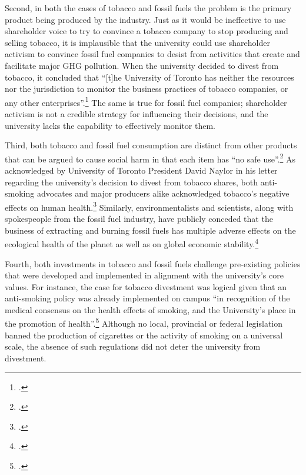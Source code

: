 Second, in both the cases of tobacco and fossil fuels the problem is the primary product being produced by the industry.
Just as it would be ineffective to use shareholder voice to try to convince a tobacco company to stop producing and selling tobacco, it is implausible that the university could use shareholder activism to convince fossil fuel companies to desist from activities that create and facilitate major GHG pollution.
When the university decided to divest from tobacco, it concluded that ``[t]he University of Toronto has neither the resources nor the jurisdiction to monitor the business practices of tobacco companies, or any other enterprises''.\footcite[][p. 7]{TobaccoReport_2007}
The same is true for fossil fuel companies; shareholder activism is not a credible strategy for influencing their decisions, and the university lacks the capability to effectively monitor them.



Third, both tobacco and fossil fuel consumption are distinct from other products that can be argued to cause social harm in that each item has ``no safe use''.\footcite[See: ][p. 9]{TobaccoReport_2007}
As acknowledged by University of Toronto President David Naylor in his letter regarding the university's decision to divest from tobacco shares, both anti-smoking advocates and major producers alike acknowledged tobacco's negative effects on human health.\footcite[][]{TStarSellOff}  
Similarly, environmentalists and scientists, along with spokespeople from the fossil fuel industry, have publicly conceded that the business of extracting and burning fossil fuels has multiple adverse effects on the ecological health of the planet as well as on global economic stability.\footcite[See, for example: ][p. 3--18]{OilIndustryVanDenHove}



Fourth, both investments in tobacco and fossil fuels challenge pre-existing policies that were developed and implemented in alignment with the university's core values. 
For instance, the case for tobacco divestment was logical given that an anti-smoking policy was already implemented on campus ``in recognition of the medical consensus on the health effects of smoking, and the University's place in the promotion of health''.\footcite[See: ][p. 9]{TobaccoReport_2007}
Although no local, provincial or federal legislation banned the production of cigarettes or the activity of smoking on a universal scale, the absence of such regulations did not deter the university from divestment. 



